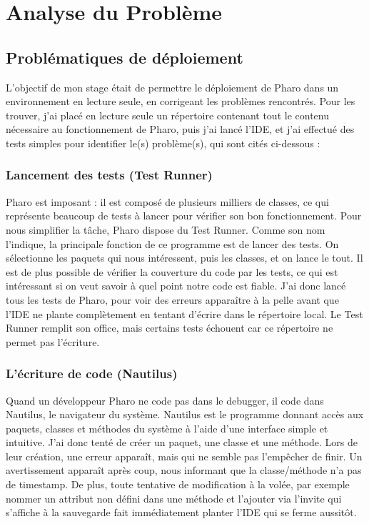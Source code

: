 \section{Analyse du Problème}

\subsection{Problématiques de déploiement}
L'objectif de mon stage était de permettre le déploiement de Pharo dans un environnement en lecture seule, en corrigeant les problèmes rencontrés. Pour les trouver, j'ai placé en lecture seule un répertoire contenant tout le contenu nécessaire au fonctionnement de Pharo, puis j'ai lancé l'IDE, et j'ai effectué des tests simples pour identifier le(s) problème(s), qui sont cités ci-dessous :

\subsubsection{Lancement des tests (Test Runner)}
Pharo est imposant : il est composé de plusieurs milliers de classes, ce qui représente beaucoup de tests à lancer pour vérifier son bon fonctionnement. Pour nous simplifier la tâche, Pharo dispose du Test Runner. Comme son nom l'indique, la principale fonction de ce programme est de lancer des tests. On sélectionne les paquets qui nous intéressent, puis les classes, et on lance le tout. Il est de plus possible de vérifier la couverture du code par les tests, ce qui est intéressant si on veut savoir à quel point notre code est fiable. J'ai donc lancé tous les tests de Pharo, pour voir des erreurs apparaître à la pelle avant que l'IDE ne plante complètement en tentant d'écrire dans le répertoire local. Le Test Runner remplit son office, mais certains tests échouent car ce répertoire ne permet pas l'écriture.

\subsubsection{L'écriture de code (Nautilus)}
Quand un développeur Pharo ne code pas dans le debugger, il code dans Nautilus, le navigateur du système. Nautilus est le programme donnant accès aux paquets, classes et méthodes du système à l'aide d'une interface simple et intuitive. J'ai donc tenté de créer un paquet, une classe et une méthode. Lors de leur création, une erreur apparaît, mais qui ne semble pas l'empêcher de finir. Un avertissement apparaît après coup, nous informant que la classe/méthode n'a pas de timestamp. De plus, toute tentative de modification à la volée, par exemple nommer un attribut non défini dans une méthode et l'ajouter via l'invite qui s'affiche à la sauvegarde fait immédiatement planter l'IDE qui se ferme aussitôt.